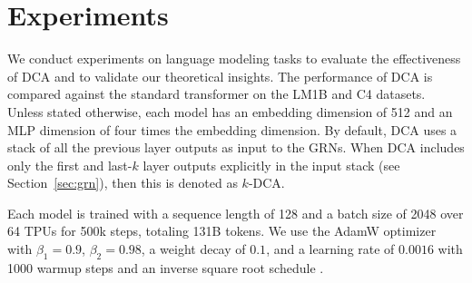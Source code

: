\section{Experiments}
\label{sec:experiments}



We conduct experiments on language modeling tasks to evaluate the effectiveness of DCA and to validate our theoretical insights. The performance of DCA is compared against the standard transformer \citep{vaswani2017attention} on the LM1B \citep{chelba2013one} and C4 \citep{2020t5} datasets. Unless stated otherwise, each model has an embedding dimension of 512 and an MLP dimension of four times the embedding dimension. By default, DCA uses a stack of all the previous layer outputs as input to the GRNs. When DCA includes only the first and last-$k$ layer outputs explicitly in the input stack (see Section~\ref{sec:grn}), then this is denoted as $k$-DCA. 

Each model is trained with a sequence length of 128 and a batch size of 2048 over 64 TPUs for 500k steps, totaling 131B tokens. We use the AdamW optimizer \citep{loshchilov2017decoupled} with $\beta_1 = 0.9$, $\beta_2 = 0.98$, a weight decay of $0.1$, and a learning rate of $0.0016$ with 1000 warmup steps and an inverse square root schedule \citep{raffel2020exploring}.



